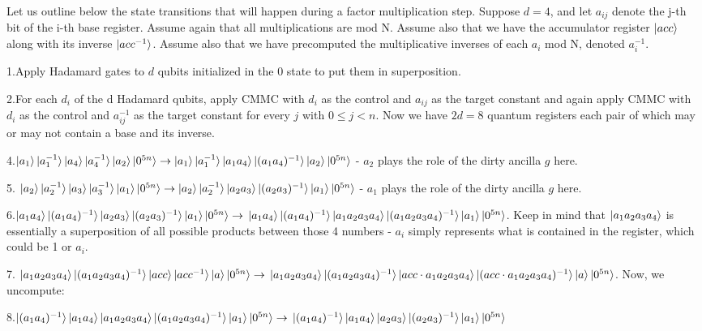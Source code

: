 Let us outline below the state transitions that will happen during a factor multiplication step. Suppose $d = 4$, and let $a_{ij}$ denote the j-th bit of the i-th base register. Assume again that all multiplications are mod N. Assume also that we have the accumulator register $\ket{acc}$ along with its inverse $\ket{acc^{-1}}$. Assume also that we have precomputed the multiplicative inverses of each $a_i$ mod N, denoted $a^{-1}_{i}$.

1.Apply Hadamard gates to $d$ qubits initialized in the 0 state to put them in superposition.

2.For each $d_i$ of the d Hadamard qubits, apply CMMC with $d_i$ as the control and $a_{ij}$ as the target constant and again apply CMMC with $d_i$ as the control and $a^{-1}_{ij}$ as the target constant for every $j$ with $0\leq j < n$. Now we have $2d = 8$ quantum registers each pair of which may or may not contain a base and its inverse.

4.$\ket{a_1} \ket{a_1^{-1}} \ket{a_4} \ket{a_4^{-1}} \ket{a_2} \ket{0^{5n}} \to \ket{a_1} \ket{a_1^{-1} } \ket{a_1 a_4} \ket{(a_1a_4)^{-1}} \ket{a_2} \ket{0^{5n}}$ - $a_2$ plays the role of the dirty ancilla $g$ here.

5. $\ket{a_2} \ket{a_2^{-1}} \ket{a_3} \ket{a_3^{-1}} \ket{a_1} \ket{0^{5n}} \to \ket{a_2} \ket{a_2^{-1} } \ket{a_2 a_3} \ket{(a_2a_3)^{-1}} \ket{a_1} \ket{0^{5n}}$ - $a_1$ plays the role of the dirty ancilla $g$ here.

6.$\ket{a_1 a_4} \ket{(a_1a_4)^{-1}} \ket{a_2 a_3} \ket{(a_2a_3)^{-1}} \ket{a_1} \ket{0^{5n}} \to \\ \ket{a_1 a_4} \ket{(a_1a_4)^{-1}} \ket{a_1a_2a_3a_4} \ket{(a_1a_2a_3a_4)^{-1}} \ket{a_1} \ket{0^{5n}}$. Keep in mind that $\ket{a_1 a_2 a_3 a_4}$ is essentially a superposition of all possible products between those 4 numbers - $a_i$ simply represents what is contained in the register, which could be 1 or $a_i$. 

7. $\ket{a_1a_2a_3a_4} \ket{(a_1a_2a_3a_4)^{-1}} \ket{acc} \ket{acc^{-1}} \ket {a} \ket{0^{5n}} \to \\ \ket{a_1a_2a_3a_4} \ket{(a_1a_2a_3a_4)^{-1}} \ket{acc \cdot a_1a_2a_3a_4} \ket{(acc \cdot a_1a_2a_3a_4)^{-1}} \ket {a} \ket{0^{5n}}$. Now, we uncompute:

8.$\ket{(a_1a_4)^{-1}} \ket{a_1 a_4}  \ket{a_1a_2a_3a_4} \ket{(a_1a_2a_3a_4)^{-1}} \ket{a_1} \ket{0^{5n}} \to \\ \ket{(a_1a_4)^{-1}} \ket{a_1 a_4} \ket{a_2 a_3} \ket{(a_2a_3)^{-1}} \ket{a_1} \ket{0^{5n}}$

